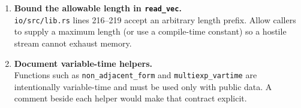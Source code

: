 \documentclass[12pt,a4paper]{article}
\begin{document}
\begin{enumerate}[label=\textbf{\arabic*.}]
  \item \textbf{Bound the allowable length in \texttt{read\_vec}.}\\
        \texttt{io/src/lib.rs} lines 216–219 accept an arbitrary
        length prefix.  Allow callers to supply a maximum length (or
        use a compile-time constant) so a hostile stream cannot exhaust
        memory.
  \item \textbf{Document variable-time helpers.}\\
        Functions such as
        \texttt{non\_adjacent\_form} and
        \texttt{multiexp\_vartime} are intentionally variable-time and
        must be used only with public data.  A comment beside each helper
        would make that contract explicit.


\end{enumerate}
\end{document}
